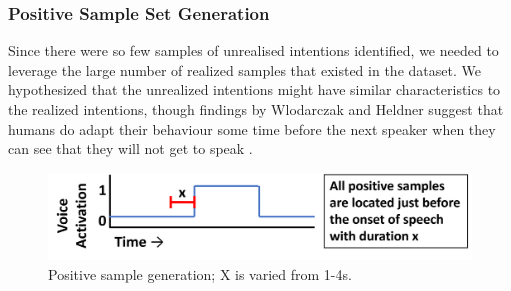 \documentclass[sigconf]{acmart}
\begin{document}

\subsubsection{Positive Sample Set Generation}
Since there were so few samples of unrealised intentions identified, we needed to leverage the large number of realized samples that existed in the dataset. We hypothesized that the unrealized intentions might have similar characteristics to the realized intentions, though findings by Wlodarczak and Heldner suggest that humans do adapt their behaviour some time before the next speaker when they can see that they will not get to speak \cite{wlodarczak2020breathing}. 

\begin{figure}
  \includegraphics[width=\columnwidth]{samples/vad10.png}
  \vspace{-4mm}
  \caption{Positive sample generation; X is varied from 1-4s.}
    \vspace{-2mm}
  \label{fig:vad}
\end{figure}
\end{document}
